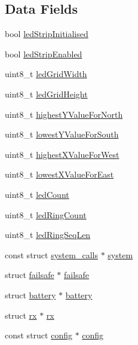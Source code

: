 \subsection*{Data Fields}
\begin{DoxyCompactItemize}
\item 
bool \hyperlink{structledstrip_af273bcb2aec363d4ab0fc7cdb9cb5087}{led\+Strip\+Initialised}
\item 
bool \hyperlink{structledstrip_a8e669baee1a8b21e56fc678fdf29f568}{led\+Strip\+Enabled}
\item 
uint8\+\_\+t \hyperlink{structledstrip_a592d8d79e04320ed5a22bd1e550e41f5}{led\+Grid\+Width}
\item 
uint8\+\_\+t \hyperlink{structledstrip_a704b71f7afa110b8e083dae751925002}{led\+Grid\+Height}
\item 
uint8\+\_\+t \hyperlink{structledstrip_a4229538210bf143752c0c1028033329d}{highest\+Y\+Value\+For\+North}
\item 
uint8\+\_\+t \hyperlink{structledstrip_a3bd6da4dddc63ceec2ae5679ca9f8a52}{lowest\+Y\+Value\+For\+South}
\item 
uint8\+\_\+t \hyperlink{structledstrip_a513a585945a1f2d727c768fb6ca982a5}{highest\+X\+Value\+For\+West}
\item 
uint8\+\_\+t \hyperlink{structledstrip_a3d17dd05feb7c4617e23899cfb92f356}{lowest\+X\+Value\+For\+East}
\item 
uint8\+\_\+t \hyperlink{structledstrip_aee9b26e311493dbc5300fef0af3f5ad7}{led\+Count}
\item 
uint8\+\_\+t \hyperlink{structledstrip_a073d7f7d58c0fb1f5b49745cbaf9c73d}{led\+Ring\+Count}
\item 
uint8\+\_\+t \hyperlink{structledstrip_a3de34939a533723ef4669028c1deccd3}{led\+Ring\+Seq\+Len}
\item 
const struct \hyperlink{structsystem__calls}{system\+\_\+calls} $\ast$ \hyperlink{structledstrip_a6f53375ca6f69251c47dd0e987267757}{system}
\item 
struct \hyperlink{structfailsafe}{failsafe} $\ast$ \hyperlink{structledstrip_a3ed8fe5023777c44893e984b4b3abf99}{failsafe}
\item 
struct \hyperlink{structbattery}{battery} $\ast$ \hyperlink{structledstrip_aba6cb5cdf50f1b2ac4c834193db5a4d3}{battery}
\item 
struct \hyperlink{structrx}{rx} $\ast$ \hyperlink{structledstrip_a7d7585060085e213f829865ee0a6c3b5}{rx}
\item 
const struct \hyperlink{structconfig}{config} $\ast$ \hyperlink{structledstrip_adb814be629218d849959fed8240c4476}{config}
\end{DoxyCompactItemize}


